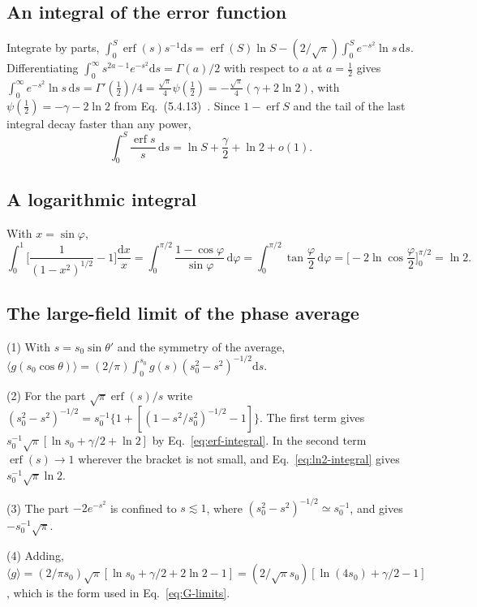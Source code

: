 \documentclass[11pt]{article}
\numberwithin{equation}{section}
\newcommand{\dd}{\mathrm d}
\DeclareMathOperator{\erf}{erf}
\begin{document}
\subsection{An integral of the error function}
Integrate by parts, $\int_0^S\erf(s)s^{-1}\dd s=\erf(S)\ln S-(2/\sqrt\pi)\int_0^Se^{-s^2}\ln s\,\dd s$.
Differentiating $\int_0^\infty s^{2a-1}e^{-s^2}\dd s=\Gamma(a)/2$ with respect to $a$
at $a=\tfrac12$ gives $\int_0^\infty e^{-s^2}\ln s\,\dd s=\Gamma'(\tfrac12)/4
=\tfrac{\sqrt\pi}{4}\psi(\tfrac12)=-\tfrac{\sqrt\pi}{4}(\gamma+2\ln2)$, with
$\psi(\tfrac12)=-\gamma-2\ln2$ from Eq.~(5.4.13)~\cite{DLMF}. Since
$1-\erf S$ and the tail of the last integral decay faster than any power,
\begin{equation}
\int_0^S\frac{\erf s}{s}\,\dd s=\ln S+\frac\gamma2+\ln2+o(1).
\label{eq:erf-integral}
\end{equation}

\subsection{A logarithmic integral}
With $x=\sin\varphi$,
\begin{equation}
\int_0^1\Big[\frac{1}{(1-x^2)^{1/2}}-1\Big]\frac{\dd x}{x}
=\int_0^{\pi/2}\frac{1-\cos\varphi}{\sin\varphi}\,\dd\varphi
=\int_0^{\pi/2}\tan\frac\varphi2\,\dd\varphi=\Big[-2\ln\cos\frac\varphi2\Big]_0^{\pi/2}=\ln2.
\label{eq:ln2-integral}
\end{equation}

\subsection{The large-field limit of the phase average}
{\noindent}(1) With $s=s_0\sin\theta'$ and the symmetry of the average,
$\langle g(s_0\cos\theta)\rangle=(2/\pi)\int_0^{s_0}g(s)(s_0^2-s^2)^{-1/2}\dd s$.

{\noindent}(2) For the part $\sqrt\pi\erf(s)/s$ write
$(s_0^2-s^2)^{-1/2}=s_0^{-1}\{1+[(1-s^2/s_0^2)^{-1/2}-1]\}$. The first term gives
$s_0^{-1}\sqrt\pi[\ln s_0+\gamma/2+\ln2]$ by Eq.~\eqref{eq:erf-integral}. In the
second term $\erf(s)\to1$ wherever the bracket is not small, and
Eq.~\eqref{eq:ln2-integral} gives $s_0^{-1}\sqrt\pi\ln2$.

{\noindent}(3) The part $-2e^{-s^2}$ is confined to $s\lesssim1$, where
$(s_0^2-s^2)^{-1/2}\simeq s_0^{-1}$, and gives $-s_0^{-1}\sqrt\pi$.

{\noindent}(4) Adding, $\langle g\rangle=(2/\pi s_0)\sqrt\pi[\ln s_0+\gamma/2+2\ln2-1]
=(2/\sqrt\pi s_0)[\ln(4s_0)+\gamma/2-1]$, which is the form used in
Eq.~\eqref{eq:G-limits}.
\end{document}
